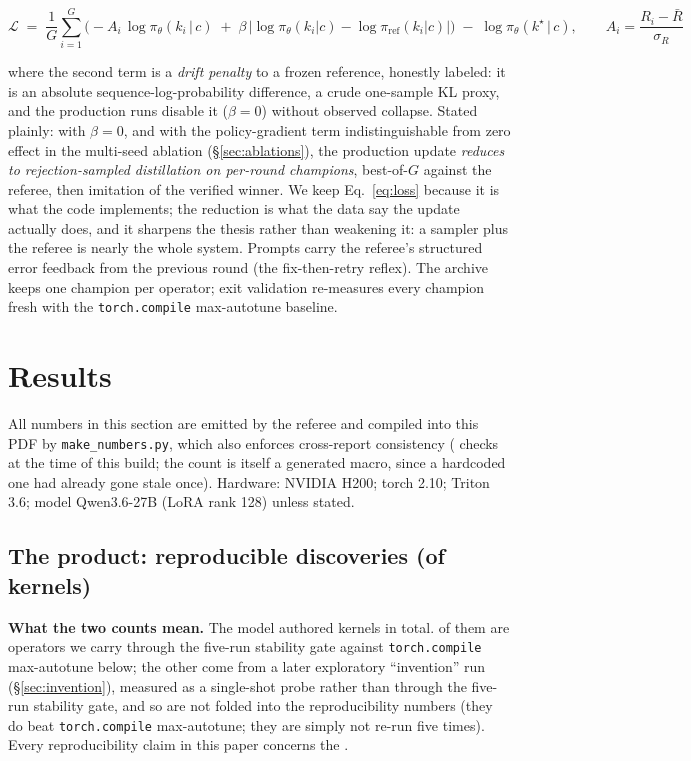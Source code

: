 \documentclass[10pt]{article}
\newcommand{\maxauto}{\texttt{torch.compile} max-autotune}
\begin{document}
\begin{equation}\label{eq:loss}
\mathcal{L} \;=\; \frac{1}{G}\sum_{i=1}^{G}\Big(
-A_i \,\log \pi_\theta(k_i\,|\,c)
\;+\; \beta\,\big|\log \pi_\theta(k_i|c) - \log \pi_{\mathrm{ref}}(k_i|c)\big|\Big)
\;-\; \log \pi_\theta(k^\star\,|\,c),
\qquad A_i = \frac{R_i - \bar R}{\sigma_R}
\end{equation}

\noindent where the second term is a \emph{drift penalty} to a frozen reference, honestly
labeled: it is an absolute sequence-log-probability difference, a crude one-sample KL
proxy, and the production runs disable it ($\beta{=}0$) without observed collapse.
Stated plainly: with $\beta{=}0$, and with the policy-gradient term indistinguishable from
zero effect in the multi-seed ablation (\S\ref{sec:ablations}), the production update
\emph{reduces to rejection-sampled distillation on per-round champions}, best-of-$G$
against the referee, then imitation of the verified winner. We keep
Eq.~\ref{eq:loss} because it is what the code implements; the reduction is what the data
say the update actually does, and it sharpens the thesis rather than
weakening it: a sampler plus the referee is nearly the whole system. Prompts carry the referee's structured error feedback from the previous round
(the fix-then-retry reflex). The archive keeps one champion per operator; exit validation
re-measures every champion fresh with the \maxauto{} baseline.

\section{Results}\label{sec:results}

All numbers in this section are emitted by the referee and compiled into this PDF by
\texttt{make\_numbers.py}, which also enforces cross-report consistency
(\consistencyChecks{} checks at the time of this build; the count is itself a generated
macro, since a hardcoded one had already gone stale once). Hardware: NVIDIA H200; torch
2.10; Triton 3.6; model
Qwen3.6-27B (LoRA rank 128) unless stated.

\subsection{The product: \stabOps{} reproducible discoveries (of \productKernels{} kernels)}

\textbf{What the two counts mean.} The model authored \productKernels{} kernels in total.
\stabOps{} of them are operators we carry through the five-run stability gate against
\maxauto{} below; the other \numKernelsExplore{} come from a later exploratory ``invention''
run (\S\ref{sec:invention}), measured as a single-shot probe rather than through the
five-run stability gate, and so are not folded into the reproducibility numbers (they do
beat \maxauto{}; they are simply not re-run five times). Every reproducibility claim in
this paper concerns the \stabOps{}.
\end{document}
